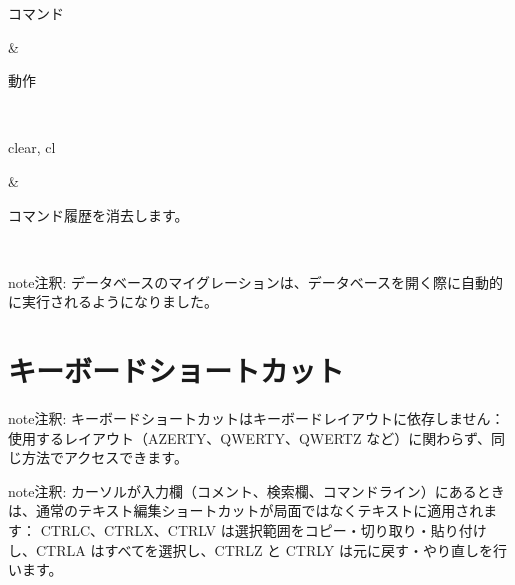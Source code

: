 \documentclass[letterpaper,10pt,dvipdfmx]{sphinxmanual}
\begin{document}
\begin{savenotes}\sphinxattablestart
\sphinxthistablewithglobalstyle
\centering
\begin{tabular}[t]{}
\sphinxtoprule
\begin{varwidth}[t]{}
\sphinxstyletheadfamily \sphinxAtStartPar
コマンド
\sphinxbeforeendvarwidth
\end{varwidth}%
&\begin{varwidth}[t]{}
\sphinxstyletheadfamily \sphinxAtStartPar
動作
\sphinxbeforeendvarwidth
\end{varwidth}%
\\
\sphinxmidrule
\sphinxtableatstartofbodyhook\begin{varwidth}[t]{}
\sphinxAtStartPar
clear, cl
\sphinxbeforeendvarwidth
\end{varwidth}%
&\begin{varwidth}[t]{}
\sphinxAtStartPar
コマンド履歴を消去します。
\sphinxbeforeendvarwidth
\end{varwidth}%
\\
\sphinxbottomrule
\end{tabular}
\sphinxtableafterendhook\par
\sphinxattableend\end{savenotes}

\begin{sphinxadmonition}{note}{注釈:}
\sphinxAtStartPar
データベースのマイグレーションは、データベースを開く際に自動的に実行されるようになりました。
\end{sphinxadmonition}

\sphinxstepscope


\section{キーボードショートカット}
\label{\detokenize{raccourcis:raccourcis-clavier}}\label{\detokenize{raccourcis:raccourcis}}\label{\detokenize{raccourcis::doc}}
\begin{sphinxadmonition}{note}{注釈:}
\sphinxAtStartPar
キーボードショートカットはキーボードレイアウトに依存しません： 使用するレイアウト（AZERTY、QWERTY、QWERTZ など）に関わらず、同じ方法でアクセスできます。
\end{sphinxadmonition}

\begin{sphinxadmonition}{note}{注釈:}
\sphinxAtStartPar
カーソルが入力欄（コメント、検索欄、コマンドライン）にあるときは、通常のテキスト編集ショートカットが局面ではなくテキストに適用されます： CTRL\sphinxhyphen{}C、CTRL\sphinxhyphen{}X、CTRL\sphinxhyphen{}V は選択範囲をコピー・切り取り・貼り付けし、CTRL\sphinxhyphen{}A はすべてを選択し、CTRL\sphinxhyphen{}Z と CTRL\sphinxhyphen{}Y は元に戻す・やり直しを行います。
\end{sphinxadmonition}
\end{document}
